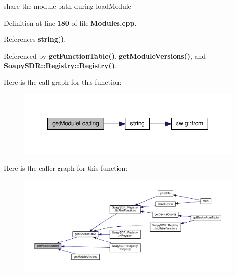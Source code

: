share the module path during load\+Module 



Definition at line {\bf 180} of file {\bf Modules.\+cpp}.



References {\bf string()}.



Referenced by {\bf get\+Function\+Table()}, {\bf get\+Module\+Versions()}, and {\bf Soapy\+S\+D\+R\+::\+Registry\+::\+Registry()}.



Here is the call graph for this function\+:
\nopagebreak
\begin{figure}[H]
\begin{center}
\leavevmode
\includegraphics[width=350pt]{d6/d4f/Registry_8cpp_a51b084ed3acf06f3caf1b7fa19a0fd40_cgraph}
\end{center}
\end{figure}




Here is the caller graph for this function\+:
\nopagebreak
\begin{figure}[H]
\begin{center}
\leavevmode
\includegraphics[width=350pt]{d6/d4f/Registry_8cpp_a51b084ed3acf06f3caf1b7fa19a0fd40_icgraph}
\end{center}
\end{figure}


